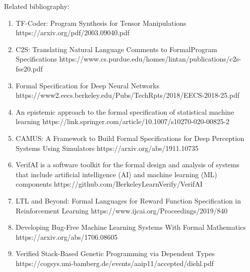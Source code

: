 \documentclass[aspectratio=169]{beamer}
\begin{document}
\begin{frame}

Related bibliography:

{\footnotesize
  \begin{enumerate}
  \item TF-Coder: Program Synthesis for Tensor Manipulations
    https://arxiv.org/pdf/2003.09040.pdf

  \item C2S: Translating Natural Language Comments to FormalProgram Specifications
    https://www.cs.purdue.edu/homes/lintan/publications/c2s-fse20.pdf

  \item Formal Specification for Deep Neural Networks
    https://www2.eecs.berkeley.edu/Pubs/TechRpts/2018/EECS-2018-25.pdf

  \item An epistemic approach to the formal specification of statistical
    machine learning
    https://link.springer.com/article/10.1007/s10270-020-00825-2

  \item CAMUS: A Framework to Build Formal Specifications for Deep Perception
    Systems Using Simulators
    https://arxiv.org/abs/1911.10735

  \item VerifAI is a software toolkit for the formal design and analysis of
    systems that include artificial intelligence (AI) and machine learning
    (ML) components
    https://github.com/BerkeleyLearnVerify/VerifAI

  \item LTL and Beyond: Formal Languages for Reward Function Specification in
    Reinforcement Learning
    https://www.ijcai.org/Proceedings/2019/840

  \item Developing Bug-Free Machine Learning Systems With Formal Mathematics
    https://arxiv.org/abs/1706.08605

  \item Verified Stack-Based Genetic Programming via Dependent Types
    https://cogsys.uni-bamberg.de/events/aaip11/accepted/diehl.pdf
  \end{enumerate}
}

\end{frame}
\end{document}
